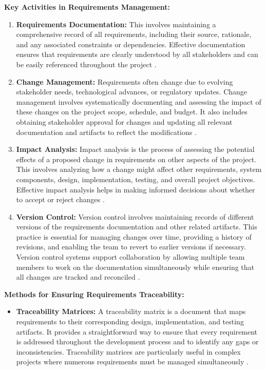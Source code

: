 \begin{refsection}
\textbf{Key Activities in Requirements Management:}

\begin{enumerate}
    \item \textbf{Requirements Documentation:} This involves maintaining a comprehensive record of all requirements, including their source, rationale, and any associated constraints or dependencies. Effective documentation ensures that requirements are clearly understood by all stakeholders and can be easily referenced throughout the project \cite[pp.~85-100]{sommerville2016software}.

    \item \textbf{Change Management:} Requirements often change due to evolving stakeholder needs, technological advances, or regulatory updates. Change management involves systematically documenting and assessing the impact of these changes on the project scope, schedule, and budget. It also includes obtaining stakeholder approval for changes and updating all relevant documentation and artifacts to reflect the modifications \cite[pp.~190-210]{pohl2010requirements}.

    \item \textbf{Impact Analysis:} Impact analysis is the process of assessing the potential effects of a proposed change in requirements on other aspects of the project. This involves analyzing how a change might affect other requirements, system components, design, implementation, testing, and overall project objectives. Effective impact analysis helps in making informed decisions about whether to accept or reject changes \cite[pp.~105-120]{bentley2007systems}.

    \item \textbf{Version Control:} Version control involves maintaining records of different versions of the requirements documentation and other related artifacts. This practice is essential for managing changes over time, providing a history of revisions, and enabling the team to revert to earlier versions if necessary. Version control systems support collaboration by allowing multiple team members to work on the documentation simultaneously while ensuring that all changes are tracked and reconciled \cite[pp.~175-190]{leffingwell2011agile}.
\end{enumerate}

\textbf{Methods for Ensuring Requirements Traceability:}

\begin{itemize}
    \item \textbf{Traceability Matrices:} A traceability matrix is a document that maps requirements to their corresponding design, implementation, and testing artifacts. It provides a straightforward way to ensure that every requirement is addressed throughout the development process and to identify any gaps or inconsistencies. Traceability matrices are particularly useful in complex projects where numerous requirements must be managed simultaneously \cite[pp.~95-110]{gotel1994requirements}.
    

\end{itemize}
\end{refsection}
